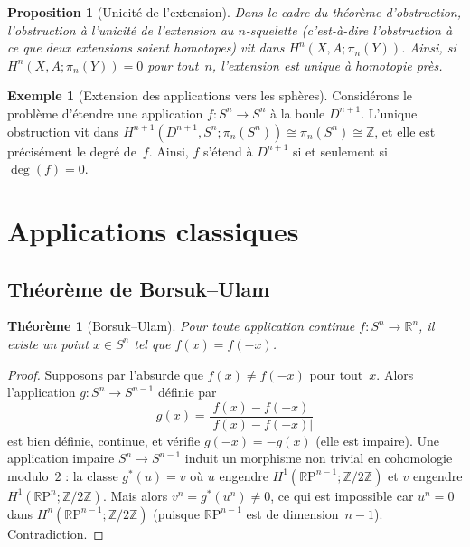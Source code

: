 \documentclass[12pt,a4paper,openany]{book}
\theoremstyle{definition}
\newtheorem{exemple}[definition]{Exemple}
\theoremstyle{plain}
\newtheorem{theoreme}[definition]{Théorème}
\newtheorem{proposition}[definition]{Proposition}
\theoremstyle{remark}
\newcommand{\Z}{\mathbb{Z}}
\newcommand{\R}{\mathbb{R}}
\newcommand{\RP}{\mathbb{R}\mathrm{P}}
\newcommand{\abs}[1]{\left|#1\right|}
\begin{document}
\begin{proposition}[Unicité de l'extension]\label{prop:unicite-extension}
  Dans le cadre du théorème d'obstruction, l'\emph{obstruction à l'unicité} de
  l'extension au $n$-squelette (c'est-à-dire l'obstruction à ce que deux extensions
  soient homotopes) vit dans $H^n(X, A; \pi_n(Y))$. Ainsi, si
  $H^n(X, A; \pi_n(Y)) = 0$ pour tout~$n$, l'extension est unique à homotopie
  près.
\end{proposition}

\begin{exemple}[Extension des applications vers les sphères]\label{ex:extension-spheres}
  Considérons le problème d'étendre une application $f \colon S^n \to S^n$ à la boule
  $D^{n+1}$. L'unique obstruction vit dans
  $H^{n+1}(D^{n+1}, S^n; \pi_n(S^n)) \cong \pi_n(S^n) \cong \Z$,
  et elle est précisément le degré de~$f$. Ainsi, $f$ s'étend à $D^{n+1}$ si et
  seulement si $\deg(f) = 0$.
\end{exemple}

\section{Applications classiques}\label{sec:applications-obstruction}

\subsection{Théorème de Borsuk--Ulam}\label{subsec:borsuk-ulam}

\begin{theoreme}[Borsuk--Ulam]\label{thm:borsuk-ulam}
  Pour toute application continue $f \colon S^n \to \R^n$, il existe un point
  $x \in S^n$ tel que $f(x) = f(-x)$.
\end{theoreme}

\begin{proof}
  Supposons par l'absurde que $f(x) \neq f(-x)$ pour tout~$x$. Alors l'application
  $g \colon S^n \to S^{n-1}$ définie par
  \[
    g(x) = \frac{f(x) - f(-x)}{\abs{f(x) - f(-x)}}
  \]
  est bien définie, continue, et vérifie $g(-x) = -g(x)$ (elle est impaire).
  Une application impaire $S^n \to S^{n-1}$ induit un morphisme non trivial en
  cohomologie modulo~$2$ : la classe $g^*(u) = v$ où $u$ engendre
  $H^1(\RP^{n-1}; \Z/2\Z)$ et $v$ engendre $H^1(\RP^n; \Z/2\Z)$. Mais alors
  $v^n = g^*(u^n) \neq 0$, ce qui est impossible car $u^n = 0$ dans
  $H^n(\RP^{n-1}; \Z/2\Z)$ (puisque $\RP^{n-1}$ est de dimension~$n-1$).
  Contradiction.
\end{proof}
\end{document}
